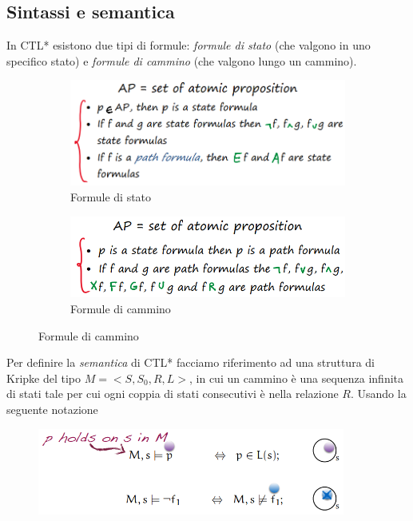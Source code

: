 \documentclass[a4paper,oneside,titlepage]{book}
\begin{document}
\subsection{Sintassi e semantica}
In CTL* esistono due tipi di formule: \textit{formule di stato} (che valgono in uno specifico stato) e \textit{formule di cammino} (che valgono lungo un cammino).
\begin{figure}[htp]
	\begin{subfigure}{0.49\textwidth}
	    \centering
		\includegraphics[width=\textwidth, height=\textheight, keepaspectratio]{ctl2.png}
		\caption{Formule di stato}
	\end{subfigure}
	\hfill
	\begin{subfigure}{0.49\textwidth}
	    \centering
		\includegraphics[width=\textwidth, height=\textheight, keepaspectratio]{ctl3.png}
		\caption{Formule di cammino}
	\end{subfigure}
\end{figure}

\noindent
Per definire la \textit{semantica} di CTL* facciamo riferimento ad una struttura di Kripke del tipo $M=<S,S_0,R,L>$, in cui un cammino è una sequenza infinita di stati tale per cui ogni coppia di stati consecutivi è nella relazione $R$. Usando la seguente notazione
\begin{figure}[htp]
	\centering
	\includegraphics[width=0.9\textwidth]{ctl4.png}
\end{figure}
\end{document}
